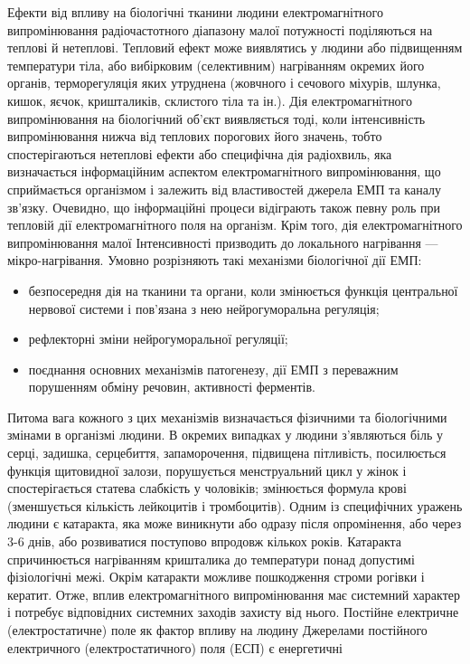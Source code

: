 \documentclass[14pt]{extarticle} %
\begin{document}
Ефекти від впливу на біологічні тканини людини електромагнітного випромінювання
радіочастотного діапазону малої потужності поділяються на теплові й нетеплові.
Тепловий ефект може виявлятись у людини або підвищенням температури тіла, або
вибірковим (селективним) нагріванням окремих його органів, терморегуляція яких
утруднена (жовчного і сечового міхурів, шлунка, кишок, яєчок, кришталиків,
склистого тіла та ін.). Дія електромагнітного випромінювання на біологічний
об'єкт виявляється тоді, коли інтенсивність випромінювання нижча від теплових
порогових його значень, тобто спостерігаються нетеплові ефекти або специфічна
дія радіохвиль, яка визначається інформаційним аспектом електромагнітного
випромінювання, що сприймається організмом і залежить від властивостей джерела
ЕМП та каналу зв'язку. Очевидно, що інформаційні процеси відіграють також певну
роль при тепловій дії електромагнітного поля на організм. Крім того, дія
електромагнітного випромінювання малої Інтенсивності призводить до локального
нагрівання — мікро-нагрівання.
Умовно розрізняють такі механізми біологічної дії ЕМП:
\begin{itemize}
\item безпосередня дія на тканини та органи, коли змінюється функція центральної
нервової системи і пов'язана з нею нейрогуморальна регуляція;
\item рефлекторні зміни нейрогуморальної регуляції;
\item поєднання основних механізмів патогенезу, дії ЕМП з переважним порушенням
обміну речовин, активності ферментів. 
\end{itemize}
Питома вага кожного з цих механізмів
визначається фізичними та біологічними змінами в організмі людини.
В окремих випадках у людини з'являються біль у серці, задишка, серцебиття,
запаморочення, підвищена пітливість, посилюється функція щитовидної залози,
порушується менструальний цикл у жінок і спостерігається статева слабкість у
чоловіків; змінюється формула крові (зменшується кількість лейкоцитів і
тромбоцитів). Одним із специфічних уражень людини є катаракта, яка може
виникнути або одразу після опромінення, або через 3-6 днів, або розвиватися
поступово впродовж кількох років. Катаракта спричинюється нагріванням
кришталика до температури понад допустимі фізіологічні межі. Окрім катаракти
можливе пошкодження строми рогівки і кератит.
Отже, вплив електромагнітного випромінювання має системний характер і потребує
відповідних системних заходів захисту від нього.
Постійне електричне (електростатичне) поле як фактор впливу на людину
Джерелами постійного електричного (електростатичного) поля (ЕСП) є енергетичні
\end{document}

